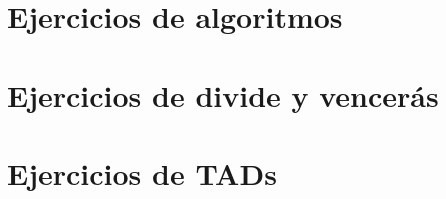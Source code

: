 \documentclass{scrreprt}
\begin{document}
\section{Ejercicios de algoritmos}


\section{Ejercicios de divide y vencerás}


\section{Ejercicios de TADs}

\end{document}
